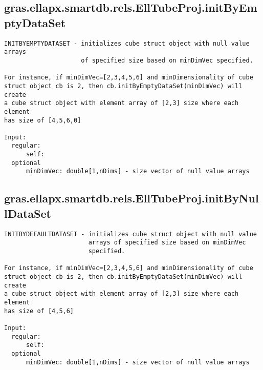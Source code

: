 \subsection{\texorpdfstring{gras.ellapx.smartdb.rels.EllTubeProj.initByEmptyDataSet}{initByEmptyDataSet}}\label{method:gras.ellapx.smartdb.rels.EllTubeProj.initByEmptyDataSet}
\begin{verbatim}
INITBYEMPTYDATASET - initializes cube struct object with null value arrays
                     of specified size based on minDimVec specified.

For instance, if minDimVec=[2,3,4,5,6] and minDimensionality of cube
struct object cb is 2, then cb.initByEmptyDataSet(minDimVec) will create
a cube struct object with element array of [2,3] size where each element
has size of [4,5,6,0]

Input:
  regular:
      self:
  optional
      minDimVec: double[1,nDims] - size vector of null value arrays
\end{verbatim}
\subsection{\texorpdfstring{gras.ellapx.smartdb.rels.EllTubeProj.initByNullDataSet}{initByNullDataSet}}\label{method:gras.ellapx.smartdb.rels.EllTubeProj.initByNullDataSet}
\begin{verbatim}
INITBYDEFAULTDATASET - initializes cube struct object with null value
                       arrays of specified size based on minDimVec
                       specified.

For instance, if minDimVec=[2,3,4,5,6] and minDimensionality of cube
struct object cb is 2, then cb.initByEmptyDataSet(minDimVec) will create
a cube struct object with element array of [2,3] size where each element
has size of [4,5,6]

Input:
  regular:
      self:
  optional
      minDimVec: double[1,nDims] - size vector of null value arrays
\end{verbatim}
